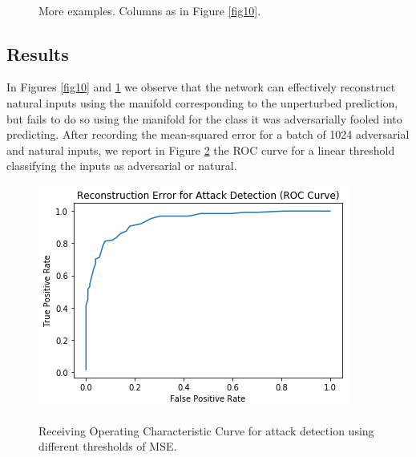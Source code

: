 \documentclass{asaproc}
\begin{document}
\begin{figure}[h!]
	\centering
	\caption{\enspace More examples. Columns as in Figure \ref{fig10}.}
	 \\
	\label{fig11}
\end{figure}

\subsection*{Results}

In Figures \ref{fig10} and \ref{fig11} we observe that the network can effectively reconstruct natural inputs using the manifold corresponding to the unperturbed prediction, but fails to do so using the manifold for the class it was adversarially fooled into predicting. After recording the mean-squared error for a batch of 1024 adversarial and natural inputs, we report in Figure \ref{fig12} the ROC curve for a linear threshold classifying the inputs as adversarial or natural.

\begin{figure}[h!]
	\centering
	\caption{\enspace Receiving Operating Characteristic Curve for attack detection using different thresholds of MSE.}
	\includegraphics[width=\linewidth]{mse_roc}
	\label{fig12}
\end{figure}
\end{document}
